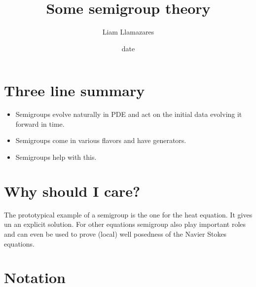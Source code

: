 \documentclass[12pt]{article}
\begin{document}
\begin{CJK*}{UTF8}{gbsn}
	\title{Some semigroup theory}
	\author{Liam Llamazares}
	\date{date}
	\maketitle
	\section{ Three line summary}
	\begin{itemize}
		\item Semigroups evolve naturally in PDE and act on the initial data evolving it forward in time.
		\item Semigroups come in various flavors and have generators.
		\item Semigroups help with this.
	\end{itemize}
	\section{Why should I care?}
	The prototypical example of a semigroup is the one for the heat equation. It gives un an explicit solution. For other equations semigroup also play important roles and can even be used to prove
	(local) well posedness of the Navier Stokes equations.
	\section{Notation}


\end{CJK*}
\end{document}
